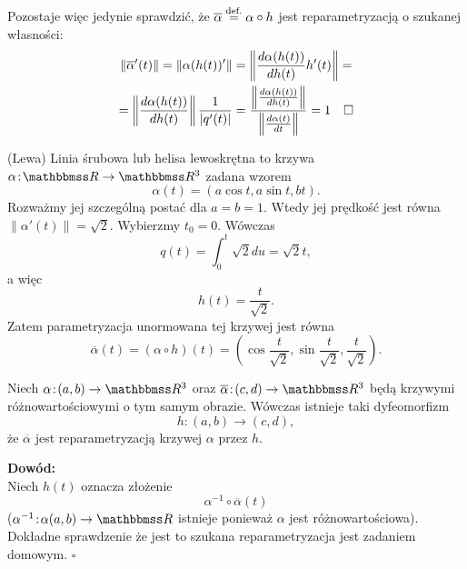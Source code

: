 \begin{frame}[<+->]
Pozostaje więc jedynie sprawdzić, że $\overline{\alpha}\define\alpha\circ h$ jest reparametryzacją o szukanej własności:
\pause\begin{multline*}
\|\overline{\alpha}'(t)\|=\le\|\alpha(h(t))'\ri\|=\le\|\frac{d\alpha(h(t))}{dh(t)}h'(t)\ri\|=\\=\le\|\frac{d\alpha(h(t))}{dh(t)}\ri\|\frac{1}{|q'(t)|}=\frac{\le\|\frac{d\alpha(h(t))}{dh(t)}\ri\|}{\le\|\frac{d\alpha(t)}{dt}\ri\|}=1\quad\square
\end{multline*}
\end{frame}
\begin{frame}[<+->]
\begin{przyklad}
(Lewa) Linia śrubowa lub helisa lewoskrętna to krzywa $\alpha\colon \R\to \R^3$ zadana wzorem
\[\alpha(t)=(a\cos{t},a\sin{t},bt).\]
Rozważmy jej szczególną postać dla $a=b=1$. Wtedy jej prędkość jest równa $\|\alpha'(t)\|=\sqrt{2}$. Wybierzmy $t_0=0$. Wówczas \[q(t)=\int_0^t\sqrt{2} du=\sqrt{2}t,\] a więc \[h(t)=\frac{t}{\sqrt{2}}.\] Zatem parametryzacja unormowana tej krzywej jest równa \[\overline{\alpha}(t)=(\alpha\circ h)(t)=\left(\cos{\frac{t}{\sqrt{2}}},\sin{\frac{t}{\sqrt{2}}},\frac{t}{\sqrt{2}}\right)\!.\]
\end{przyklad}

\end{frame}
\begin{frame}[<+->]

\begin{center}
\begin{tikzpicture}[y=0.80pt, x=0.8pt,scale=0.7,yscale=-1, inner sep=0pt, outer sep=0pt]

\end{tikzpicture}
\end{center}
\end{frame}
\begin{frame}

\begin{lemat}
Niech $\alpha\colon (a,b)\to \R^3$ oraz $\overline{\alpha}\colon (c,d)\to \R^3$ będą krzywymi różnowartościowymi o tym samym obrazie. Wówczas istnieje taki dyfeomorfizm \[h\colon (a,b)\to (c,d),\] że $\overline{\alpha}$ jest reparametryzacją krzywej $\alpha$ przez $h$.
\end{lemat}
\pause \textcolor{ared}{\textbf{Dowód:}}\\
Niech $h(t)$ oznacza złożenie \[\alpha^{-1}\circ \overline{\alpha} (t)\] 
($\alpha^{-1}\colon \alpha(a,b)\to \R$ istnieje ponieważ $\alpha$ jest 
r\'ożnowartościowa). Dokładne sprawdzenie że jest to szukana reparametryzacja 
jest zadaniem domowym.
\hfill $\square$

\end{frame}
